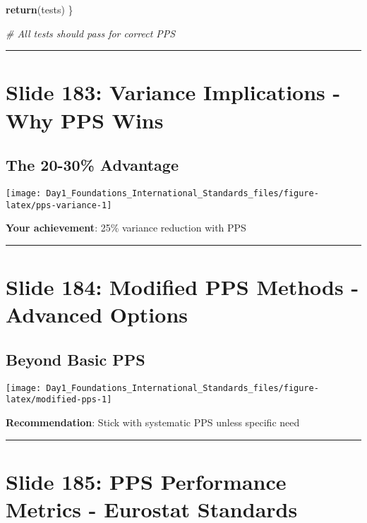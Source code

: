 \documentclass[
]{article}
\newenvironment{Shaded}{\begin{snugshade}}{\end{snugshade}}
\newcommand{\CommentTok}[1]{\textcolor[rgb]{0.56,0.35,0.01}{\textit{#1}}}
\newcommand{\FunctionTok}[1]{\textcolor[rgb]{0.13,0.29,0.53}{\textbf{#1}}}
\newcommand{\NormalTok}[1]{#1}
\begin{document}
\begin{Shaded}
\begin{Highlighting}[]
  \FunctionTok{return}\NormalTok{(tests)}
\NormalTok{\}}

\CommentTok{\# All tests should pass for correct PPS}
\end{Highlighting}
\end{Shaded}

\begin{center}\rule{0.5\linewidth}{0.5pt}\end{center}

\section{Slide 183: Variance Implications - Why PPS
Wins}\label{slide-183-variance-implications---why-pps-wins}

\subsection{The 20-30\% Advantage}\label{the-20-30-advantage}

\texttt{[image: Day1\_Foundations\_International\_Standards\_files/figure-latex/pps-variance-1]}

\textbf{Your achievement}: 25\% variance reduction with PPS

\begin{center}\rule{0.5\linewidth}{0.5pt}\end{center}

\section{Slide 184: Modified PPS Methods - Advanced
Options}\label{slide-184-modified-pps-methods---advanced-options}

\subsection{Beyond Basic PPS}\label{beyond-basic-pps}

\texttt{[image: Day1\_Foundations\_International\_Standards\_files/figure-latex/modified-pps-1]}

\textbf{Recommendation}: Stick with systematic PPS unless specific need

\begin{center}\rule{0.5\linewidth}{0.5pt}\end{center}

\section{Slide 185: PPS Performance Metrics - Eurostat
Standards}\label{slide-185-pps-performance-metrics---eurostat-standards}
\end{document}
